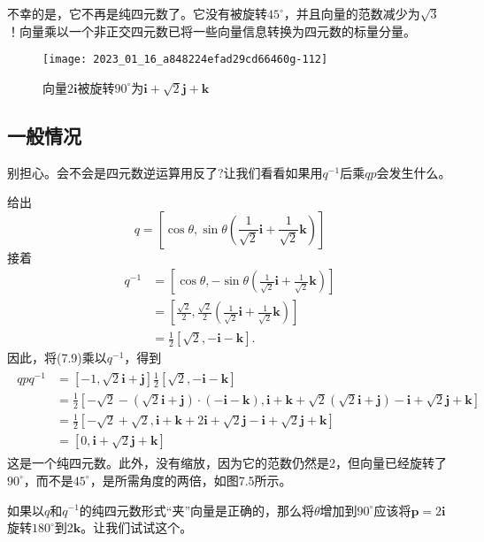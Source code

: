 不幸的是，它不再是纯四元数了。它没有被旋转$45^{\circ}$，并且向量的范数减少为$\sqrt{3}$ ！向量乘以一个非正交四元数已将一些向量信息转换为四元数的标量分量。

\begin{figure}[h!]
    \centering
    \texttt{[image: 2023\_01\_16\_a848224efad29cd66460g-112]}
    \caption[short]{向量$2 \mathbf{i}$被旋转$90^{\circ}$为$\mathbf{i}+\sqrt{2} \mathbf{j}+\mathbf{k}$}
\end{figure}

\subsection{一般情况}
别担心。会不会是四元数逆运算用反了?让我们看看如果用$q^{-1}$后乘$q p$会发生什么。

给出
$$
q=\left[\cos \theta, \sin \theta\left(\frac{1}{\sqrt{2}} \mathbf{i}+\frac{1}{\sqrt{2}} \mathbf{k}\right)\right]
$$
接着
$$
\begin{aligned}
q^{-1} & =\left[\cos \theta,-\sin \theta\left(\frac{1}{\sqrt{2}} \mathbf{i}+\frac{1}{\sqrt{2}} \mathbf{k}\right)\right] \\
& =\left[\frac{\sqrt{2}}{2}, \frac{\sqrt{2}}{2}\left(\frac{1}{\sqrt{2}} \mathbf{i}+\frac{1}{\sqrt{2}} \mathbf{k}\right)\right] \\
& =\frac{1}{2}[\sqrt{2},-\mathbf{i}-\mathbf{k}] .
\end{aligned}
$$
因此，将(7.9)乘以$q^{-1}$，得到
\begin{align}
    \begin{aligned}
        q p q^{-1} & =[-1, \sqrt{2} \mathbf{i}+\mathbf{j}] \frac{1}{2}[\sqrt{2},-\mathbf{i}-\mathbf{k}] \\
        & =\frac{1}{2}[-\sqrt{2}-(\sqrt{2} \mathbf{i}+\mathbf{j}) \cdot(-\mathbf{i}-\mathbf{k}), \mathbf{i}+\mathbf{k}+\sqrt{2}(\sqrt{2} \mathbf{i}+\mathbf{j})-\mathbf{i}+\sqrt{2} \mathbf{j}+\mathbf{k}] \\
        & =\frac{1}{2}[-\sqrt{2}+\sqrt{2}, \mathbf{i}+\mathbf{k}+2 \mathbf{i}+\sqrt{2} \mathbf{j}-\mathbf{i}+\sqrt{2} \mathbf{j}+\mathbf{k}] \\
        & =[0, \mathbf{i}+\sqrt{2} \mathbf{j}+\mathbf{k}]
    \end{aligned}
\end{align}
这是一个纯四元数。此外，没有缩放，因为它的范数仍然是2，但向量已经旋转了$90^{\circ}$，而不是$45^{\circ}$，是所需角度的两倍，如图7.5所示。

如果以$q$和$q^{-1}$的纯四元数形式“夹”向量是正确的，那么将$\theta$增加到$90^{\circ}$应该将$ \mathbf{p}=2 \mathbf{i}$旋转$180^{\circ}$到$2 \mathbf{k}$。让我们试试这个。

